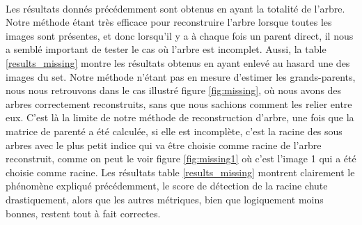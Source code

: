 \documentclass[utf8,final]{stageM2R} %
\begin{document}
\paragraph{}

Les résultats donnés précédemment sont obtenus en ayant la totalité de l'arbre. Notre méthode étant très efficace pour reconstruire l'arbre lorsque toutes les images sont présentes, et donc lorsqu'il y a à chaque fois un parent direct, il nous a semblé important de tester le cas où l'arbre est incomplet. Aussi, la table \ref{results_missing} montre les résultats obtenus en ayant enlevé au hasard une des images du set. Notre méthode n'étant pas en mesure d'estimer les grands-parents, nous nous retrouvons dans le cas illustré figure \ref{fig:missing}, où nous avons des arbres correctement reconstruits, sans que nous sachions comment les relier entre eux. C'est là la limite de notre méthode de reconstruction d'arbre, une fois que la matrice de parenté a été calculée, si elle est incomplète, c'est la racine des sous arbres avec le plus petit indice qui va être choisie comme racine de l'arbre reconstruit, comme on peut le voir figure \ref{fig:missing1} où c'est l'image 1 qui a été choisie comme racine. Les résultats table \ref{results_missing} montrent clairement le phénomène expliqué précédemment, le score de détection de la racine chute drastiquement, alors que les autres métriques, bien que logiquement moins bonnes, restent tout à fait correctes.
\end{document}
